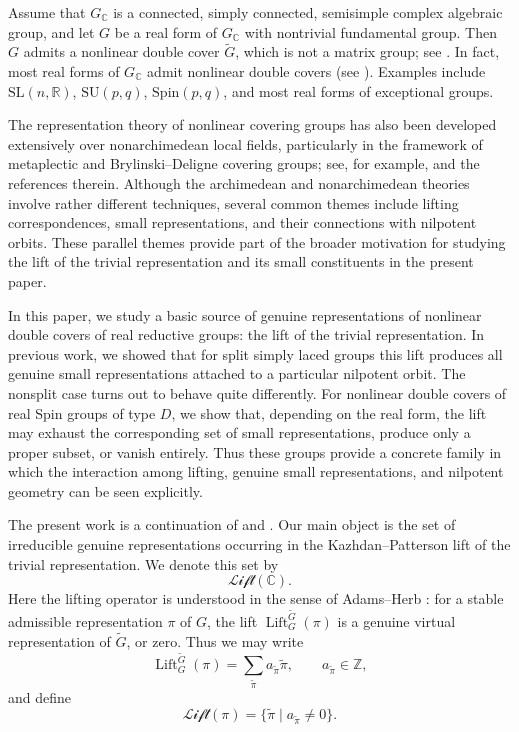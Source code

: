 \documentclass{amsart}
\DeclareMathOperator{\Lift}{Lift}
\newcommand{\LLift}{\mathscr{Lift}}
\newcommand{\bbC}{{\mathbb{C}}}
\newcommand{\bbR}{{\mathbb R}}
\newcommand{\bbZ}{{\mathbb Z}}
\newcommand{\Spin}{{\mathrm{Spin}}}
\newcommand{\SL}{{\mathrm{SL}}}
\newcommand{\SU}{\mathrm{SU}}
\theoremstyle{definition}
\newcommand{\tu}{\widetilde}
\begin{document}
Assume that $G_\bbC$ is a connected, simply connected, semisimple complex
algebraic group, and let $G$ be a real form of $G_\bbC$ with nontrivial
fundamental group. Then $G$ admits a nonlinear double cover $\tu G$, which is
not a matrix group; see \cite[Proposition 3.6]{AT12}. In fact, most real forms
of $G_\bbC$ admit nonlinear double covers (see \cite{A04}). Examples include
$\SL(n,\bbR)$, $\SU(p,q)$, $\Spin(p,q)$, and most real forms of exceptional
groups.
\medskip



The representation theory of nonlinear covering groups has also been
developed extensively over nonarchimedean local fields, particularly in
the framework of metaplectic and Brylinski--Deligne covering groups;
see, for example, \cite{BD01,GGW18,Wei18,GG18} and the references therein.
Although the archimedean and nonarchimedean theories involve rather different techniques, several common themes include lifting correspondences, small representations, and their connections with nilpotent orbits. These parallel themes provide part of the broader motivation for studying the lift of the trivial representation and its small constituents in the present paper.

\medskip 

In this paper, we study a basic source of genuine representations of nonlinear double covers of real reductive groups: the lift of the trivial representation. In previous work, we showed that for split simply laced groups this lift produces all genuine small representations attached to a particular nilpotent orbit. The nonsplit case turns out to behave quite differently. For nonlinear double covers of real Spin groups of type $D$, we show that, depending on the real form, the lift may exhaust the corresponding set of small representations, produce only a proper subset, or vanish entirely. Thus these groups provide a concrete family in which the interaction among lifting, genuine small representations, and nilpotent geometry can be seen explicitly.


\medskip


The present work is a continuation of \cite{Ts19} and \cite{Ts23}. Our main object is
the set of irreducible genuine representations occurring in the
Kazhdan--Patterson lift of the trivial representation. We denote this set by
$$
\LLift(\bbC).
$$
Here the lifting operator is understood in the sense of Adams--Herb
\cite{AHe10}: for a stable admissible representation $\pi$ of $G$, the lift
$\Lift_G^{\tu G}(\pi)$ is a genuine virtual representation of $\tu G$, or zero.
Thus we may write
\[
\Lift_G^{\tu G}(\pi)=\sum_{\tu\pi} a_{\tu\pi}\tu\pi,
\qquad a_{\tu\pi}\in\bbZ,
\]
and define
\[
\LLift(\pi)=\{\tu\pi\mid a_{\tu\pi}\neq 0\}.
\]
\end{document}
